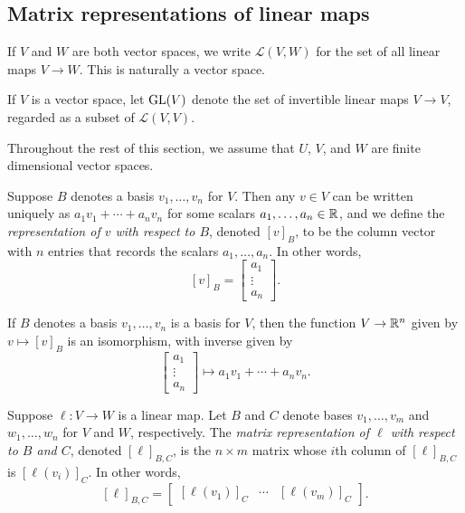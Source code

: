 \subsection{Matrix representations of linear maps} \label{matrix-representations}

\begin{definition} 
	If $V$ and $W$ are both vector spaces, we write $\mathscr{L}(V, W)$ for the set of all linear maps $V \to W$. This is naturally a vector space. 
\end{definition}

\begin{definition} 
	If $V$ is a vector space, let $\operatorname{GL}(V)$ denote the set of invertible linear maps $V \to V$, regarded as a subset of $\mathscr{L}(V,V)$. 
\end{definition}

Throughout the rest of this section, we assume that $U$, $V$, and $W$ are finite dimensional vector spaces. 

\begin{definition} 
	Suppose $B$ denotes a basis $v_1, \dotsc, v_n$ for $V$. Then any $v \in V$ can be written uniquely as $a_1v_1 + \dotsb + a_n v_n$ for some scalars $a_1, \dotsc, a_n \in \mathbb{R}$, and we define the \emph{representation of $v$ with respect to $B$}, denoted $[v]_B$, to be the column vector with $n$ entries that records the scalars $a_1, \dotsc, a_n$. In other words,
	\[ [v]_B = \begin{bmatrix} a_1 \\ \vdots \\ a_n \end{bmatrix}. \]
\end{definition}

\begin{lemma}
	If $B$ denotes a basis $v_1, \dotsc, v_n$ is a basis for $V$, then the function $V \to \mathbb{R}^n$ given by $v \mapsto [v]_B$ is an isomorphism, with inverse given by
	\[ \begin{bmatrix} a_1 \\ \vdots \\ a_n \end{bmatrix} \mapsto a_1 v_1 + \dotsb + a_n v_n. \]
\end{lemma}

\begin{definition} \label{matrix-representation-linear} 
	Suppose $\ell : V \to W$ is a linear map. Let $B$ and $C$ denote bases $v_1, \dotsc, v_m$ and $w_1, \dotsc, w_n$ for $V$ and $W$, respectively. The \emph{matrix representation of $\ell$ with respect to $B$ and $C$}, denoted $[\ell]_{B,C}$, is the $n \times m$ matrix whose $i$th column of $[\ell]_{B,C}$ is $[\ell(v_i)]_C$. In other words,
	\[ [\ell]_{B,C} = \begin{bmatrix} [\ell(v_1)]_C & \dotsb & [\ell(v_m)]_C \end{bmatrix}. \]
\end{definition}

